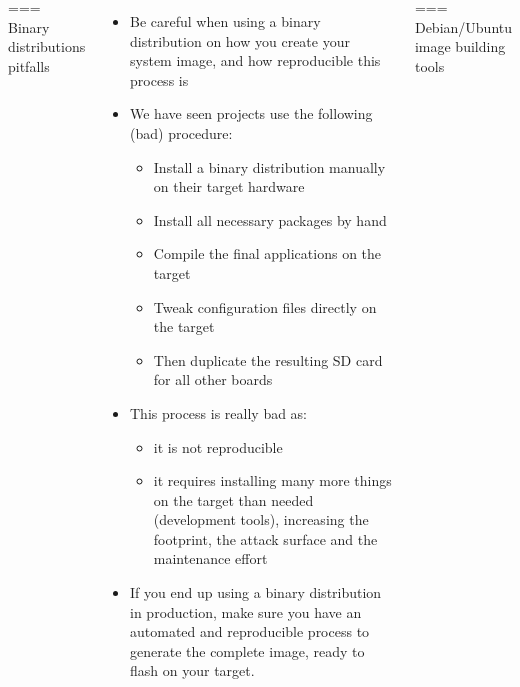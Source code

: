 \begin{columns}
=== {Binary distributions pitfalls}
  \begin{itemize}
  \item Be careful when using a binary distribution on how you create
    your system image, and how reproducible this process is
  \item We have seen projects use the following (bad) procedure:
    \begin{itemize}
    \item Install a binary distribution manually on their target hardware
    \item Install all necessary packages by hand
    \item Compile the final applications on the target
    \item Tweak configuration files directly on the target
    \item Then duplicate the resulting SD card for all other boards
    \end{itemize}
  \item This process is really bad as:
    \begin{itemize}
    \item it is not reproducible
    \item it requires installing many more things on the target than
      needed (development tools), increasing the footprint, the attack
      surface and the maintenance effort
    \end{itemize}
  \item If you end up using a binary distribution in production, make
    sure you have an automated and reproducible process to generate
    the complete image, ready to flash on your target.
  \end{itemize}


=== {Debian/Ubuntu image building tools}
  

\end{columns}
